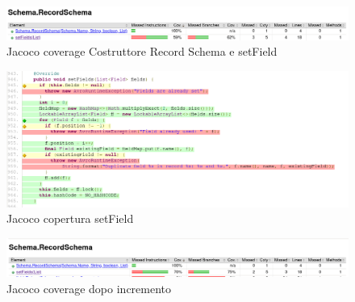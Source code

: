 \documentclass[12pt, a4paper]{article}
\begin{document}
  \begin{figure}
    \includegraphics[width=\linewidth]{./images/create_record/JacocoCoverage3.png}
    \caption{Jacoco coverage Costruttore Record Schema e setField}
    \label{fig:JacocoCoverageCreateRecord3}
  \end{figure}

  \begin{figure}
    \includegraphics[width=\linewidth]{./images/create_record/JacocoCoverage4.png}
    \caption{Jacoco copertura setField}
    \label{fig:JacocoCoverageCreateRecord4}
  \end{figure}

  \begin{figure}
    \includegraphics[width=\linewidth]{./images/create_record/JacocoCoverage5.png}
    \caption{Jacoco coverage dopo incremento}
    \label{fig:JacocoCoverageCreateRecord5}
  \end{figure}
\end{document}
